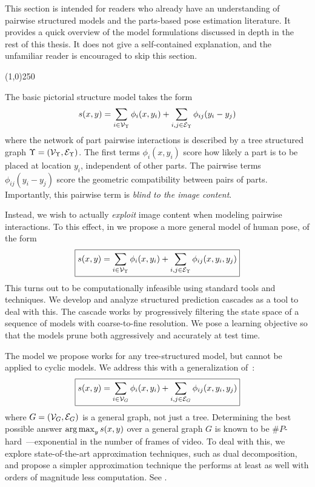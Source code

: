 This section is intended for readers who already have an understanding of 
pairwise structured models and the parts-based pose estimation literature.  It 
provides a quick overview of the model formulations discussed in depth in the 
rest of this thesis.  It does not give a self-contained explanation, and the 
unfamiliar reader is encouraged to skip this section.

\begin{center}
\line(1,0){250}
\end{center}

\noindent The basic pictorial structure model takes the form $$ s(x,y) =  
\sum_{i \in \mathcal{V}_{\Upsilon}} \phi_i(x,y_i) + \sum_{i,j \in \mathcal{E}_{\Upsilon}} 
\phi_{ij}(y_i - y_j) $$
where the network of part pairwise interactions is described by a tree 
structured graph $\Upsilon = (\mathcal{V}_\Upsilon,\mathcal{E}_\Upsilon)$.  The first terms 
$\phi_i(x,y_i)$ score how likely a part is to be placed at location $y_i$, 
independent of other parts.  The pairwise terms $\phi_{ij}(y_i-y_j)$ score the 
geometric compatibility between pairs of parts.  Importantly, this pairwise 
term is {\em blind to the image content}. 

Instead, we wish to actually {\em exploit } image content when modeling 
pairwise interactions. To this effect, in  we propose a more 
general model of human pose, of the form \begin{equation}
\boxed{s(x,y) =  \sum_{i \in \mathcal{V}_{\Upsilon}} \phi_i(x,y_i) + \sum_{i,j \in 
\mathcal{E}_{\Upsilon}} \phi_{ij}(x,y_i,y_j)}
\label{eq:contrib1}
\end{equation}
This turns out to be computationally infeasible using standard tools and 
techniques.  We develop and analyze  structured prediction cascades as a tool 
to deal with this.  The cascade works by progressively filtering the state 
space of a sequence of models with coarse-to-fine resolution.  We pose a 
learning objective so that the models prune both aggressively and accurately at 
test time.


The model we propose  works for any tree-structured model, but 
cannot be applied to cyclic models.  We address this with a generalization 
of~:
\begin{equation}
\boxed{s(x,y) =  \sum_{i \in \mathcal{V}_{G}} \phi_i(x,y_i) + \sum_{i,j \in \mathcal{E}_{G}} 
\phi_{ij}(x,y_i,y_j)}
\label{eq:contrib2}
\end{equation}
where $G = (\mathcal{V}_G,\mathcal{E}_G)$ is a general graph, not just a tree.  Determining the 
best possible answer $\mathop{\arg\max}_y s(x,y)$ over a general graph $G$ is known to be 
$\#P$-hard~\citep{koller-book}---exponential in the number of frames of video.  
To deal with this, we explore state-of-the-art approximation techniques, such 
as dual decomposition, and propose a simpler approximation technique the 
performs at least as well with orders of magnitude less computation.  See 
.

